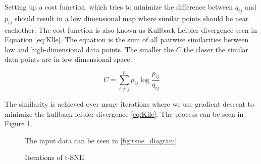 Setting up a cost function, which tries to minimize the difference between $q_{ij}$ and $p_{ij}$ should result in a low dimensional map where similar points should be near eachother.
The cost function is also known as Kullback-Leibler divergence seen in Equation \ref{eq:Klle}. 
The equation is the sum of all pairwise similarities between low and high-dimensional data points.
The smaller the $C$ the closer the similar data points are in low dimensional space.

\begin{equation}
\label{eq:Klle}
 C = \sum_{i \neq j}^n p_{ij} \log \frac{p_{ij}}{q_{ij}}
\end{equation}

The similarity is achieved over many iterations where we use gradient descent to minimize the kullback-leibler divergence \ref{eq:Klle}. 
The process can be seen in Figure \ref{fig:tsne_iterations_arrows}.

\begin{figure}[H]
    \centering
    \caption{Iterations of t-SNE}
	\par
    \par\footnotesize{The input data can be seen in \ref{fig:tsne_diagram} }
	\label{fig:tsne_iterations_arrows}
\end{figure}



